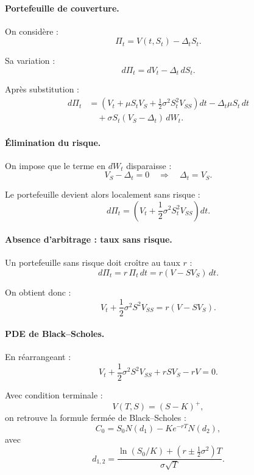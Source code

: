 \documentclass[11pt,a4paper]{article}
\newcommand{\1}{\mathbf{1}}
\begin{document}
\paragraph{Portefeuille de couverture.}

On considère :
\[
\Pi_t = V(t,S_t) - \Delta_t S_t.
\]

Sa variation :
\[
d\Pi_t = dV_t - \Delta_t\, dS_t.
\]

Après substitution :
\[
\begin{aligned}
d\Pi_t
&=
\left(
V_t
+ \mu S_t V_S
+ \frac12 \sigma^2 S_t^2 V_{SS}
\right) dt
- \Delta_t \mu S_t\, dt \\
&\quad
+ \sigma S_t( V_S - \Delta_t )\, dW_t.
\end{aligned}
\]

\paragraph{Élimination du risque.}

On impose que le terme en $dW_t$ disparaisse :
\[
V_S - \Delta_t = 0
\quad\Longrightarrow\quad
\Delta_t = V_S.
\]

Le portefeuille devient alors localement sans risque :
\[
d\Pi_t
=
\left(
V_t
+ \frac12 \sigma^2 S_t^2 V_{SS}
\right) dt.
\]

\paragraph{Absence d'arbitrage : taux sans risque.}

Un portefeuille sans risque doit croître au taux $r$ :
\[
d\Pi_t = r\, \Pi_t\, dt = r( V - S V_S )\, dt.
\]

On obtient donc :
\[
V_t + \frac12 \sigma^2 S^2 V_{SS}
= r(V - S V_S).
\]

\paragraph{PDE de Black--Scholes.}

En réarrangeant :
\[
V_t
+ \frac12 \sigma^2 S^2 V_{SS}
+ r S V_S
- r V
= 0.
\]

Avec condition terminale :
\[
V(T,S) = (S-K)^+,
\]
on retrouve la formule fermée de Black--Scholes :
\[
C_0
= S_0 N(d_1) - K e^{-rT} N(d_2),
\]
avec
\[
d_{1,2}
=
\frac{
\ln(S_0/K) + ( r \pm \tfrac12 \sigma^2 )T
}{
\sigma\sqrt{T}
}.
\]
\end{document}
